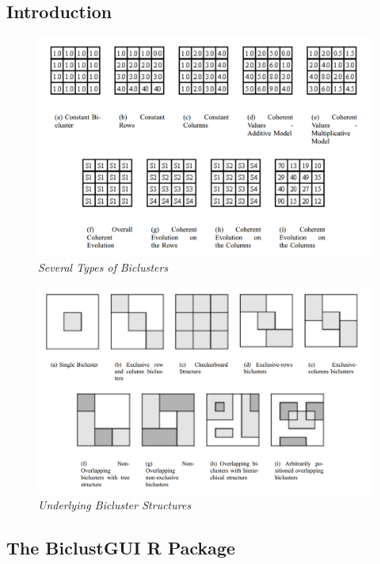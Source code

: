 \documentclass[a4paper]{article}\usepackage[]{graphicx}\usepackage[]{color}
\begin{document}
\subsection{Introduction}
\begin{figure}[H]
\centering
\includegraphics[scale=0.25]{figures/bicluster_types.png}
\caption{{\it Several Types of Biclusters}\label{bicluster_types}}
\end{figure}
\begin{figure}[H]
\centering
\includegraphics[scale=0.2]{figures/bicluster_structures.png}
\caption{{\it Underlying Bicluster Structures}\label{bicluster_structures}}
\end{figure}
\subsection{The BiclustGUI R Package}
\end{document}
